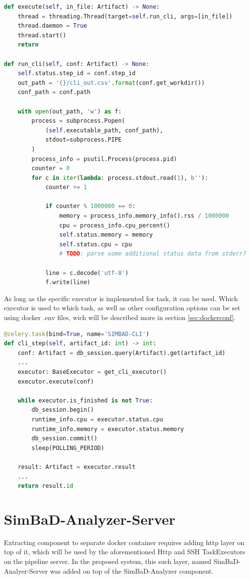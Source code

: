 \begin{lstlisting}[label=list:sp-exec-local,caption=Fragment of LocalExecutor for SimBaD-CLI, basicstyle=\footnotesize\ttfamily, language=python]
def execute(self, in_file: Artifact) -> None:
    thread = threading.Thread(target=self.run_cli, args=[in_file])
    thread.daemon = True
    thread.start()
    return
    
def run_cli(self, conf: Artifact) -> None:
    self.status.step_id = conf.step_id
    out_path = '{}/cli_out.csv'.format(conf.get_workdir())
    conf_path = conf.path

    with open(out_path, 'w') as f:
        process = subprocess.Popen(
            (self.executable_path, conf_path), 
            stdout=subprocess.PIPE
        )
        process_info = psutil.Process(process.pid)
        counter = 0
        for c in iter(lambda: process.stdout.read(1), b''):
            counter += 1

            if counter % 1000000 == 0:
                memory = process_info.memory_info().rss / 1000000
                cpu = process_info.cpu_percent()
                self.status.memory = memory
                self.status.cpu = cpu
                # TODO: parse some additional status data from stderr?

            line = c.decode('utf-8')
            f.write(line)
\end{lstlisting}
As long as the specific executor is implemented for task, it can be used. Which executor is used to which task, as well as other configuration options can be set using docker .env files, wich will be described more in section \ref{sec:dockerconf}.
\begin{lstlisting}[label=list:sp-exec-local-use,caption=Use of LocalExecutor for SimBaD-CLI step, basicstyle=\footnotesize\ttfamily, language=python]
@celery.task(bind=True, name='SIMBAD-CLI')
def cli_step(self, artifact_id: int) -> int:
    conf: Artifact = db_session.query(Artifact).get(artifact_id)
    ...
    executor: BaseExecutor = get_cli_executor()
    executor.execute(conf)

    while executor.is_finished is not True:
        db_session.begin()
        runtime_info.cpu = executor.status.cpu
        runtime_info.memory = executor.status.memory
        db_session.commit()
        sleep(POLLING_PERIOD)

    result: Artifact = executor.result
    ...
    return result.id
\end{lstlisting}
\section{SimBaD-Analyzer-Server}
Extracting component to separate docker container requires adding http layer on top of it, which will be used by the aforementioned Http and SSH TaskExecutors on the pipeline server. In the proposed system, this such layer, named SimBaD-Analyer-Server was added on top of the SimBaD-Analyzer component. 
